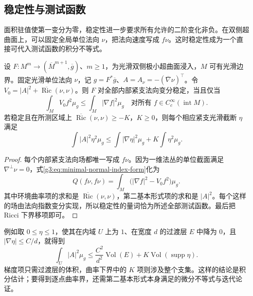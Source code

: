 \subsection{稳定性与测试函数}
\label{g3:subsec:1903:03}
面积驻值使第一变分为零，稳定性进一步要求所有允许的二阶变化非负。在双侧超曲面上，可以固定全局单位法向 \(\nu\)，把法向速度写成 \(f\nu\)。这时稳定性成为一个直接可代入测试函数的积分不等式。

\begin{proposition}\label{g3:prop:stable-minimal-test}
	设 \(F:M^m\to(\overline M^{m+1},\overline g)\)、\(m\ge1\)，为光滑双侧极小超曲面浸入，\(M\) 可有光滑边界。固定光滑单位法向 \(\nu\)，记 \(g=F^*\overline g\)、\(A=A_\nu=-(\overline\nabla\nu)^\top\)。令
	\(V_0=|A|^2+\overline{\operatorname{Ric}}(\nu,\nu)\)。则 \(F\) 对全部内部紧支法向变分稳定，当且仅当
	\begin{equation}\label{g3:eq:minimal-stability-test}
		\int_M V_0 f^2\mu_g\le\int_M|\nabla f|^2\mu_g
		\quad\text{对所有 }f\in C_c^\infty(\operatorname{int}M).
	\end{equation}
	若稳定且在所测区域上 \(\overline{\operatorname{Ric}}(\nu,\nu)\ge-K\)，\(K\ge0\)，则每个相应紧支光滑截断 \(\eta\) 满足
	\[
		\int |A|^2\eta^2\mu_g
		\le\int|\nabla\eta|^2\mu_g+K\int\eta^2\mu_g.
	\]
\end{proposition}
\begin{proof}
	每个内部紧支法向场都唯一写成 \(f\nu\)。因为一维法丛的单位截面满足 \(\nabla^\perp\nu=0\)，式\eqref{g3:eq:minimal-normal-index-form}化为
	\[
		Q(f\nu,f\nu)=\int_M\bigl(|\nabla f|^2-V_0f^2\bigr)\mu_g.
	\]
	其中环境曲率项的求和是 \(\overline{\operatorname{Ric}}(\nu,\nu)\)，第二基本形式项的求和是 \(|A|^2\)。每个这样的场由法向指数变分实现，所以稳定性的量词恰为所述全部测试函数。最后把 Ricci 下界移项即可。
\end{proof}

例如取 \(0\le\eta\le1\)，使其在内域 \(U\) 上为 \(1\)、在宽度 \(d\) 的过渡层 \(E\) 中降为 \(0\)，且 \(|\nabla\eta|\le C/d\)，就得到
\[
	\int_U|A|^2\mu_g
	\le\frac{C^2}{d^2}\operatorname{Vol}(E)
	+K\operatorname{Vol}(\operatorname{supp}\eta).
\]
梯度项只需过渡层的体积，曲率下界中的 \(K\) 项则涉及整个支集。这样的结论是积分估计；要得到逐点曲率界，还需第二基本形式本身满足的微分不等式与迭代论证。

